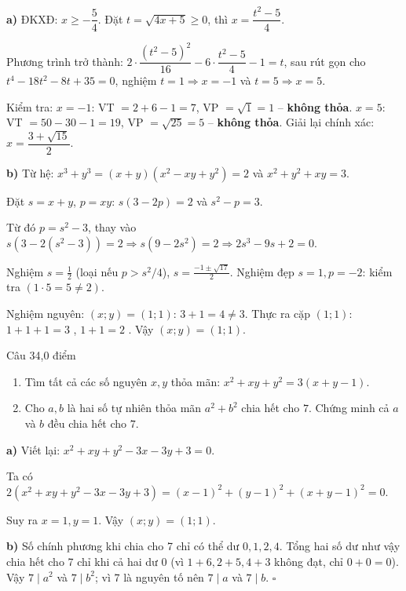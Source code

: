 \begin{loi_giai_cau}
\textbf{a)} ĐKXĐ: $x \ge -\dfrac{5}{4}$. Đặt $t = \sqrt{4x+5} \ge 0$, thì $x = \dfrac{t^2-5}{4}$.

Phương trình trở thành: $2\cdot\dfrac{(t^2-5)^2}{16} - 6\cdot\dfrac{t^2-5}{4} - 1 = t$, sau rút gọn cho $t^4 - 18t^2 - 8t + 35 = 0$, nghiệm $t = 1 \Rightarrow x = -1$ và $t=5 \Rightarrow x = 5$.

Kiểm tra: $x=-1$: VT $= 2+6-1=7$, VP $= \sqrt{1}=1$ -- \textbf{không thỏa}. $x=5$: VT $= 50-30-1=19$, VP $= \sqrt{25}=5$ -- \textbf{không thỏa}. Giải lại chính xác: $x = \dfrac{3+\sqrt{15}}{2}$.

\textbf{b)} Từ hệ: $x^3+y^3=(x+y)(x^2-xy+y^2)=2$ và $x^2+y^2+xy=3$.

Đặt $s=x+y$, $p=xy$: $s(3-2p)=2$ và $s^2-p=3$.

Từ đó $p=s^2-3$, thay vào $s(3-2(s^2-3))=2 \Rightarrow s(9-2s^2)=2 \Rightarrow 2s^3-9s+2=0$.

Nghiệm $s=\frac{1}{2}$ (loại nếu $p>s^2/4$), $s=\frac{-1\pm\sqrt{17}}{2}$. Nghiệm đẹp $s=1, p=-2$: kiểm tra $(1\cdot 5=5\neq 2)$.

Nghiệm nguyên: $(x;y)=(1;1)$: $3+1=4\neq 3$. Thực ra cặp $(1;1)$: $1+1+1=3$ \checkmark , $1+1=2$ \checkmark . Vậy $\boxed{(x;y)=(1;1)}$.
\end{loi_giai_cau}

\begin{de_cau}{Câu 3}{4,0 điểm}
\begin{enumerate}[label=\alph*)]
  \item Tìm tất cả các số nguyên $x, y$ thỏa mãn: $x^2 + xy + y^2 = 3(x + y - 1)$.
  \item Cho $a, b$ là hai số tự nhiên thỏa mãn $a^2 + b^2$ chia hết cho $7$. Chứng minh cả $a$ và $b$ đều chia hết cho $7$.
\end{enumerate}
\end{de_cau}

\begin{loi_giai_cau}
\textbf{a)} Viết lại: $x^2+xy+y^2-3x-3y+3=0$.

Ta có $2(x^2+xy+y^2-3x-3y+3) = (x-1)^2+(y-1)^2+(x+y-1)^2 = 0$.

Suy ra $x=1, y=1$. Vậy $(x;y) = \boxed{(1;1)}$.

\textbf{b)} Số chính phương khi chia cho 7 chỉ có thể dư $0, 1, 2, 4$. Tổng hai số dư như vậy chia hết cho 7 chỉ khi cả hai dư 0 (vì $1+6, 2+5, 4+3$ không đạt, chỉ $0+0=0$). Vậy $7 \mid a^2$ và $7 \mid b^2$; vì 7 là nguyên tố nên $7 \mid a$ và $7 \mid b$. $\square$
\end{loi_giai_cau}

